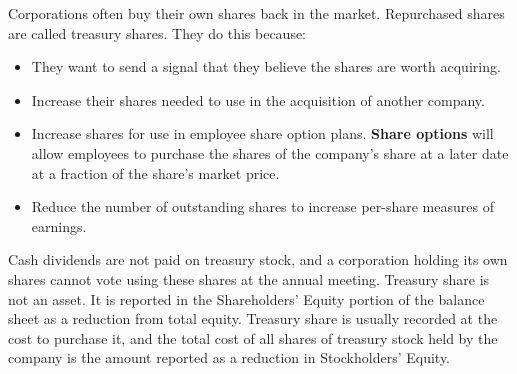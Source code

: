 \documentclass[../main.tex]{subfiles}
\begin{document}
	Corporations often buy their own shares back in the market. Repurchased 
	shares are called treasury shares. They do this because:
	\begin{itemize}[noitemsep]
		\item They want to send a signal that they believe the shares are worth 
		acquiring.
		\item Increase their shares needed to use in the acquisition of 
		another company.
		\item Increase shares for use in employee share option plans. 
		\textbf{Share options} will allow employees to purchase the shares of 
		the company’s share at a later date at a fraction of the share’s market 
		price.
		\item Reduce the number of outstanding shares to increase per-share 
		measures of earnings.
	\end{itemize}
	
	Cash dividends are not paid on treasury stock, and a corporation holding 
	its own shares cannot vote using these shares at the annual meeting. 
	Treasury share is not an asset. It is reported in the Shareholders’ Equity 
	portion of the balance sheet as a reduction from total equity. Treasury 
	share is usually recorded at the cost to purchase it, and the total cost of 
	all shares of treasury stock held by the company is the amount reported as 
	a reduction in Stockholders’ Equity.
	
\end{document}
